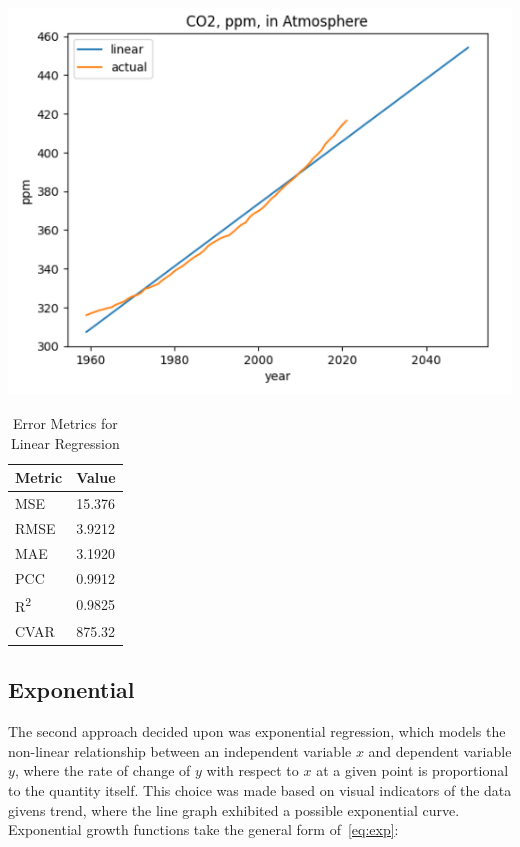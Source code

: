 \documentclass{mcmthesis}
\begin{document}
    \begin{table}[h]
        \begin{minipage}{0.7\linewidth}
            \centering
            \includegraphics[width=\textwidth]{linear}%
            \label{fig:co2_lr}
        \end{minipage}%
        \begin{minipage}{0.3\linewidth}
            \centering
            \begin{tabular}{ll}
                \toprule
                Metric               & Value  \\
                \midrule
                MSE                  & 15.376 \\
                RMSE                 & 3.9212 \\
                MAE                  & 3.1920 \\
                PCC                  & 0.9912 \\
                R\textsuperscript{2} & 0.9825 \\
                CVAR                 & 875.32 \\
                \bottomrule
            \end{tabular}
            \caption{Error Metrics for Linear Regression}
            \label{tab:co2_lr_err}
        \end{minipage}
    \end{table}



    \subsection{Exponential}
    The second approach decided upon was exponential regression, which models the non-linear relationship between an independent variable $x$ and dependent variable $y$, where the rate of change of $y$ with respect to $x$ at a given point is proportional to the quantity itself.
    This choice was made based on visual indicators of the data given\textquotesingle s trend, where the line graph exhibited a possible exponential curve.
    Exponential growth functions take the general form of~\eqref{eq:exp}:
\end{document}
